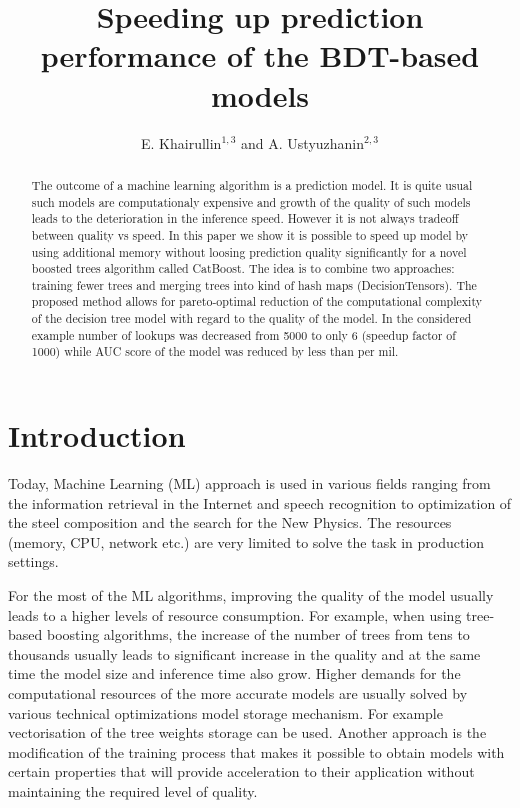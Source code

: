 \documentclass[a4paper]{jpconf}
\begin{document}
\title{Speeding up prediction performance of the BDT-based models}

\author{
 E. Khairullin$^{1, 3}$
 and
 A. Ustyuzhanin$^{2, 3}$
}
\address{$^{1}$ Moscow Institute of Physics and Technology, Institutskiy per. 9, Dolgoprudny, Moscow Region, 141700, Russia}
\address{$^{2}$ National Research University Higher School of Economics, 20 Myasnitskaya st., Moscow 101000, Russia}
\address{$^{3}$ Yandex School of Data Analysis, 11/2, Timura Frunze st., Moscow 119021, Russia}


\begin{abstract}
The outcome of a machine learning algorithm is a prediction model. It is quite usual such models are computationaly expensive and growth of the quality of such models leads to the deterioration in the inference speed. However it is not always tradeoff between quality vs speed. In this paper we show it is possible to speed up model by using additional memory without loosing prediction quality significantly for a novel boosted trees algorithm called CatBoost. The idea is to combine two approaches: training fewer trees and merging trees into kind of hash maps (DecisionTensors). The proposed method allows for pareto-optimal reduction of the computational complexity of the decision tree model with regard to the quality of the model. In the considered example number of lookups was decreased from 5000 to only 6 (speedup factor of 1000) while AUC score of the model was reduced by less than per mil.
\end{abstract}

\section{Introduction}
Today, Machine Learning (ML) approach is used in various fields ranging from the information retrieval in the Internet and speech recognition to optimization of the steel composition and the search for the New Physics.
The resources (memory, CPU, network etc.) are very limited to solve the task in production settings.

For the most of the ML algorithms, improving the quality of the model usually leads to a higher levels of resource consumption. For example, when using tree-based boosting algorithms, the increase of the number of trees from tens to thousands usually leads to significant increase in the quality and at the same time the model size and inference time also grow. Higher demands for the computational resources of the more accurate models are usually solved by various technical optimizations model storage mechanism. For example vectorisation of the tree weights storage can be used. Another approach is the modification of the training process that makes it possible to obtain models with certain properties that will provide acceleration to their application without maintaining the required level of quality.
\end{document}
